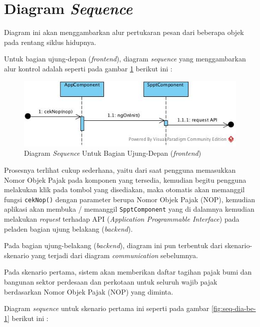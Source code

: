 \section{Diagram \textit{Sequence}}

Diagram ini akan menggambarkan alur pertukaran pesan dari beberapa objek pada rentang siklus hidupnya.

Untuk bagian ujung-depan (\textit{frontend}), diagram \textit{sequence} yang menggambarkan alur kontrol adalah seperti pada gambar \ref{fig:seq-dia-fe} berikut ini :

\begin{figure}[H]
	\centering
	\includegraphics[width=1\textwidth]{./resources/uml/seq-dia-fe}
	\caption{Diagram \textit{Sequence} Untuk Bagian Ujung-Depan (\textit{frontend})}
	\label{fig:seq-dia-fe}
\end{figure}

Prosesnya terlihat cukup sederhana, yaitu dari saat pengguna memasukkan Nomor Objek Pajak pada komponen yang tersedia, kemudian begitu pengguna melakukan klik pada tombol yang disediakan, maka otomatis akan memanggil fungsi \texttt{cekNop()} dengan parameter berupa Nomor Objek Pajak (NOP), kemudian aplikasi akan membuka / memanggil \texttt{SpptComponent} yang di dalamnya kemudian melakukan \textit{request} terhadap API (\textit{Application Programmable Interface}) pada peladen bagian ujung belakang (\textit{backend}). 

Pada bagian ujung-belakang (\textit{backend}), diagram ini pun terbentuk dari skenario-skenario yang terjadi dari diagram \textit{communication} sebelumnya.

Pada skenario pertama, sistem akan memberikan daftar tagihan pajak bumi dan bangunan sektor perdesaan dan perkotaan untuk seluruh wajib pajak berdasarkan Nomor Objek Pajak (NOP) yang diminta.

Diagram \textit{sequence} untuk skenario pertama ini seperti pada gambar \ref{fig:seq-dia-be-1} berikut ini :

